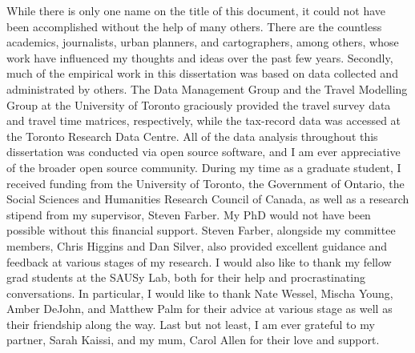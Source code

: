 \documentclass[11 pt, letterpaper]{report}
\begin{document}
While there is only one name on the title of this document, it could not have been accomplished without the help of many others. There are the countless academics, journalists, urban planners, and cartographers, among others, whose work have influenced my thoughts and ideas over the past few years. Secondly, much of the empirical work in this dissertation was based on data collected and administrated by others. The Data Management Group and the Travel Modelling Group at the University of Toronto graciously provided the travel survey data and travel time matrices, respectively, while the tax-record data was accessed at the Toronto Research Data Centre. All of the data analysis throughout this dissertation was conducted via open source software, and I am ever appreciative of the broader open source community. During my time as a graduate student, I received funding from the University of Toronto, the Government of Ontario, the Social Sciences and Humanities Research Council of Canada, as well as a research stipend from my supervisor, Steven Farber. My PhD would not have been possible without this financial support. Steven Farber, alongside my committee members, Chris Higgins and Dan Silver, also provided excellent guidance and feedback at various stages of my research. I would also like to thank my fellow grad students at the SAUSy Lab, both for their help and procrastinating conversations. In particular, I would like to thank Nate Wessel, Mischa Young, Amber DeJohn, and Matthew Palm for their advice at various stage as well as their friendship along the way. Last but not least, I am ever grateful to my partner, Sarah Kaissi, and my mum, Carol Allen for their love and support.




\newpage





\tableofcontents


\newpage







\listoffigures

\newpage



\listoftables



\hypersetup{
	colorlinks=true,
	linkcolor=red,
	citecolor=blue,
	urlcolor=blue
}
\end{document}
